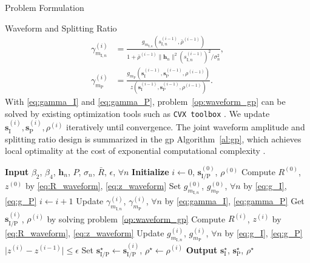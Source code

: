 \begin{section}{Problem Formulation}
\begin{subsection}{Waveform and Splitting Ratio}
		\begin{align}
			\gamma_{m_{\mathrm{I},n}}^{(i)} & = \frac{g_{m_{\mathrm{I},n}}(s_{\mathrm{I},n}^{(i-1)},\bar{\rho}^{(i-1)})}{1+{\bar{\rho}^{(i-1)}\lVert{\boldsymbol{h}_n}\rVert^2 (s_{\mathrm{I},n}^{(i-1)})^2}\big/{\sigma_n^2}}\label{eq:gamma_I},\\
			\gamma_{m_\mathrm{P}}^{(i)} & = \frac{g_{m_\mathrm{P}}(\boldsymbol{s}_{\mathrm{I}}^{(i-1)},\boldsymbol{s}_\mathrm{P}^{(i-1)},\rho^{(i-1)})}{z(\boldsymbol{s}_{\mathrm{I}}^{(i-1)},\boldsymbol{s}_\mathrm{P}^{(i-1)},\rho^{(i-1)})}\label{eq:gamma_P}.
		\end{align}
		With \eqref{eq:gamma_I} and \eqref{eq:gamma_P}, problem~\eqref{op:waveform_gp} can be solved by existing optimization tools such as \texttt{CVX toolbox} \cite{Grant2016}. We update $\boldsymbol{s}_{\mathrm{I}}^{(i)},\boldsymbol{s}_\mathrm{P}^{(i)},\rho^{(i)}$ iteratively until convergence. The joint waveform amplitude and splitting ratio design is summarized in the \gls{gp} Algorithm~\ref{al:gp}, which achieves local optimality at the cost of exponential computational complexity \cite{Chiang2005}.

		\begin{algorithm}[!t]
			\caption{\gls{gp}: Waveform Amplitude and Splitting Ratio.}
			\label{al:gp}
			\begin{algorithmic}[1]
				\State \textbf{Input} $\beta_2$, $\beta_4$, $\boldsymbol{h}_n$, $P$, $\sigma_n$, $\bar{R}$, $\epsilon$, $\forall n$
				\State \textbf{Initialize} $i \gets 0$, $\boldsymbol{s}_{\mathrm{I/P}}^{(0)}$, $\rho^{(0)}$
				\State Compute $R^{(0)}$, $z^{(0)}$ by \eqref{eq:R_waveform}, \eqref{eq:z_waveform}
				\State Set $g_{m_{\mathrm{I},n}}^{(0)}$, $g_{m_\mathrm{P}}^{(0)}$, $\forall n$ by \eqref{eq:g_I}, \eqref{eq:g_P}
				\Repeat
					\State $i \gets i + 1$
					\State Update $\gamma_{m_{\mathrm{I},n}}^{(i)}$, $\gamma_{m_\mathrm{P}}^{(i)}$, $\forall n$ by \eqref{eq:gamma_I}, \eqref{eq:gamma_P}
					\State Get $\boldsymbol{s}_{\mathrm{I/P}}^{(i)}$, $\rho^{(i)}$ by solving problem~\eqref{op:waveform_gp}
					\State Compute $R^{(i)}$, $z^{(i)}$ by \eqref{eq:R_waveform}, \eqref{eq:z_waveform}
					\State Update $g_{m_{\mathrm{I},n}}^{(i)}$, $g_{m_\mathrm{P}}^{(i)}$, $\forall n$ by \eqref{eq:g_I}, \eqref{eq:g_P}
				\Until $\lvert z^{(i)} - z^{(i-1)} \rvert \le \epsilon$
				\State Set $\boldsymbol{s}_{\mathrm{I/P}}^{\star} \gets \boldsymbol{s}_{\mathrm{I/P}}^{(i)}$, $\rho^{\star} \gets \rho^{(i)}$
				\State \textbf{Output} $\boldsymbol{s}_{\mathrm{I}}^{\star}$, $\boldsymbol{s}_{\mathrm{P}}^{\star}$, $\rho^{\star}$
			\end{algorithmic}
		\end{algorithm}


\end{subsection}
\end{section}
